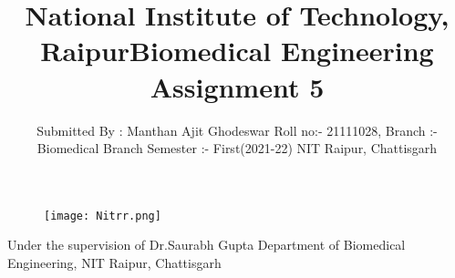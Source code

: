 \documentclass[12pt]{article}
\title{National Institute of Technology, Raipur}
\begin{document}
\maketitle
\begin{figure}[h]
\centering
\texttt{[image: Nitrr.png]}
\end{figure}
\bigskip
\bigskip
\centering
\begin{Large}
\title{Biomedical Engineering Assignment 5}
\end{Large}

\bigskip
\bigskip
\bigskip
\bigskip

\raggedright 
\begin{multicols}{2}
\author{Submitted By : Manthan Ajit Ghodeswar
\linebreak Roll no:- 21111028,
\linebreak Branch :- Biomedical Branch
\linebreak Semester :- First(2021-22)
\linebreak NIT Raipur, Chattisgarh}
\columnbreak
\columnbreak


Under the supervision of
\linebreak Dr.Saurabh Gupta
\linebreak Department of Biomedical Engineering,
\linebreak NIT Raipur, Chattisgarh
\end{multicols}


\clearpage
\end{document}

